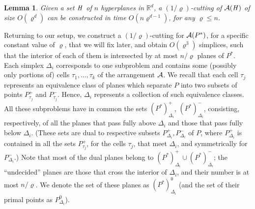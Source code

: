 \documentclass[a4paper,12pt]{article}
\def\A{{\cal A}}
\newtheorem{lemma}[theorem]{Lemma}
\begin{document}
\begin{lemma}
\label{lemma:cutting}
Given a set $\it{H}$ of $n$ hyperplanes in $\mathbb{R}^d$, a
$(1/\varrho)$-cutting of $\A(\it{H})$ of size $O(\varrho^d)$ can be constructed
in time $O(n\varrho^{d-1})$, for any $\varrho \leq n$.
\end{lemma}

Returning to our setup, we construct a $(1/\varrho)$-cutting for
$\A(P^*)$, for a specific constant value of $\varrho$, that we will
fix later, and obtain $O(\varrho^3)$ simplices, such that the
interior of each of them is intersected by at most $n/\varrho$
planes of $P^*$. Each simplex $\Delta_i$ corresponds to one
subproblem and contains some (possibly only portions of) cells
$\tau_1,\ldots,\tau_k$ of the arrangement $\A$. We recall that each
cell $\tau_j$ represents an equivalence class of planes which
separate $P$ into two subsets of points $P_{\tau_j}^+$ and
$P_{\tau_j}^-$. Hence, $\Delta_i$ represents a collection of such
equivalence classes. All these subproblems have in common the sets
$(P^*)_{\Delta_i}^+$, $(P^*)_{\Delta_i}^-$, consisting,
respectively, of all the planes that pass fully above $\Delta_i$ and
those that pass fully below $\Delta_i$. (These sets are dual to
respective subsets $P_{\Delta_i}^+, P_{\Delta_i}^-$ of $P$, where
$P_{\Delta_i}^+$ is contained in all the sets $P_{\tau_j}^+$, for
the cells $\tau_j$, that meet $\Delta_i$, and symmetrically for
$P_{\Delta_i}^-$.) Note that most of the dual planes belong to
$(P^*)_{\Delta_i}^+ \cup (P^*)_{\Delta_i}^-$; the ``undecided''
planes are those that cross the interior of $\Delta_i$, and their
number is at most $n/\varrho$. We denote the set of these planes as
$(P^*)_{\Delta_i}^0$ (and the set of their primal points as
$P_{\Delta_i}^0$).
\end{document}
